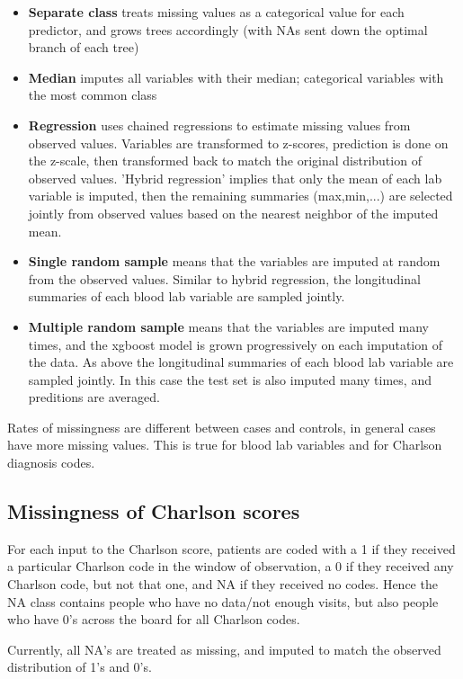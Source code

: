 \documentclass[12pt]{article}
\begin{document}
\begin{itemize}
  \item {\bf Separate class} treats missing values as a categorical value for each predictor, and grows trees accordingly (with NAs sent down the optimal branch of each tree)
  \item {\bf Median} imputes all variables with their median; categorical variables with the most common class
  \item {\bf Regression} uses chained regressions to estimate missing values from observed values. Variables are transformed to z-scores, prediction is done on the z-scale, then transformed back to match the original distribution of observed values. 'Hybrid regression' implies that only the mean of each lab variable is imputed, then the remaining summaries (max,min,...) are selected jointly from observed values based on the nearest neighbor of the imputed mean.
  \item {\bf Single random sample} means that the variables are imputed at random from the observed values. Similar to hybrid regression, the longitudinal summaries of each blood lab variable are sampled jointly.
  \item {\bf Multiple random sample} means that the variables are imputed many times, and the xgboost model is grown progressively on each imputation of the data. As above the longitudinal summaries of each blood lab variable are sampled jointly. In this case the test set is also imputed many times, and preditions are averaged.
\end{itemize}

Rates of missingness are different between cases and controls, in general cases have more missing values. This is true for blood lab variables and for Charlson diagnosis codes.

\subsection*{Missingness of Charlson scores}

For each input to the Charlson score, patients are coded with a 1 if they received a particular Charlson code in the window of observation, a 0 if they received any Charlson code, but not that one, and NA if they received no codes. Hence the NA class contains people who have no data/not enough visits, but also people who have 0's across the board for all Charlson codes.

Currently, all NA's are treated as missing, and imputed to match the observed distribution of 1's and 0's.
\end{document}

